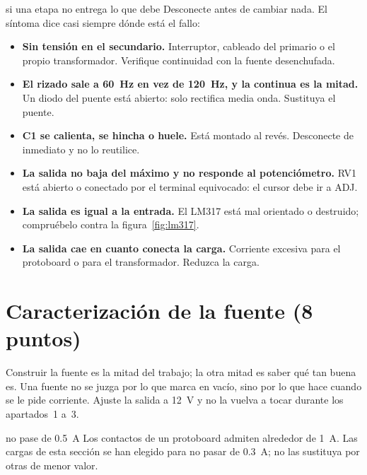 \documentclass[11pt,a4paper]{article}
\newcommand{\puntos}[1]{\normalfont\normalsize\textmd{(#1 puntos)}}
\begin{document}
\begin{notatec}{si una etapa no entrega lo que debe}
Desconecte antes de cambiar nada. El síntoma dice casi siempre dónde está el fallo:
\begin{itemize}
    \item \textbf{Sin tensión en el secundario.} Interruptor, cableado del primario o el
          propio transformador. Verifique continuidad con la fuente desenchufada.
    \item \textbf{El rizado sale a \qty{60}{\hertz} en vez de \qty{120}{\hertz}, y la
          continua es la mitad.} Un diodo del puente está abierto: solo rectifica media
          onda. Sustituya el puente.
    \item \textbf{C1 se calienta, se hincha o huele.} Está montado al revés. Desconecte de
          inmediato y no lo reutilice.
    \item \textbf{La salida no baja del máximo y no responde al potenciómetro.} RV1 está
          abierto o conectado por el terminal equivocado: el cursor debe ir a ADJ.
    \item \textbf{La salida es igual a la entrada.} El LM317 está mal orientado o
          destruido; compruébelo contra la figura~\ref{fig:lm317}.
    \item \textbf{La salida cae en cuanto conecta la carga.} Corriente excesiva para el
          protoboard o para el transformador. Reduzca la carga.
\end{itemize}
\end{notatec}

\FloatBarrier
\section{Caracterización de la fuente \puntos{8}}
\label{sec:caracterizacion}
Construir la fuente es la mitad del trabajo; la otra mitad es saber qué tan buena es. Una
fuente no se juzga por lo que marca en vacío, sino por lo que hace cuando se le pide
corriente. Ajuste la salida a \qty{12}{\volt} y no la vuelva a tocar durante los
apartados~1 a~3.

\begin{seguridad}{no pase de \qty{0.5}{\ampere}}
Los contactos de un protoboard admiten alrededor de \qty{1}{\ampere}. Las cargas de esta
sección se han elegido para no pasar de \qty{0.3}{\ampere}; no las sustituya por otras de
menor valor.
\end{seguridad}
\end{document}
